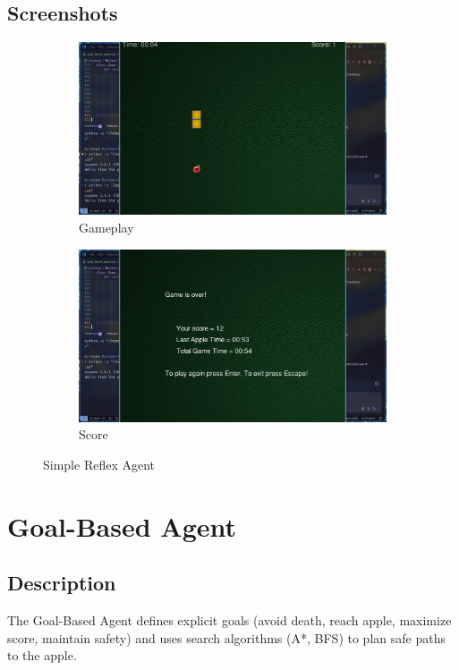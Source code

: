 \documentclass[11pt,a4paper]{article}
\begin{document}
\subsection{Screenshots}
\begin{figure}[H]
    \centering
    \begin{subfigure}{0.45\textwidth}
        \includegraphics[width=\textwidth]{ss/simple_play.png}
        \caption{Gameplay}
    \end{subfigure}
    \hfill
    \begin{subfigure}{0.45\textwidth}
        \includegraphics[width=\textwidth]{ss/simple_score.png}
        \caption{Score}
    \end{subfigure}
    \caption{Simple Reflex Agent}
\end{figure}

\section{Goal-Based Agent}
\subsection{Description}
The Goal-Based Agent defines explicit goals (avoid death, reach apple, maximize score, maintain safety) and uses search algorithms (A*, BFS) to plan safe paths to the apple.
\end{document}
